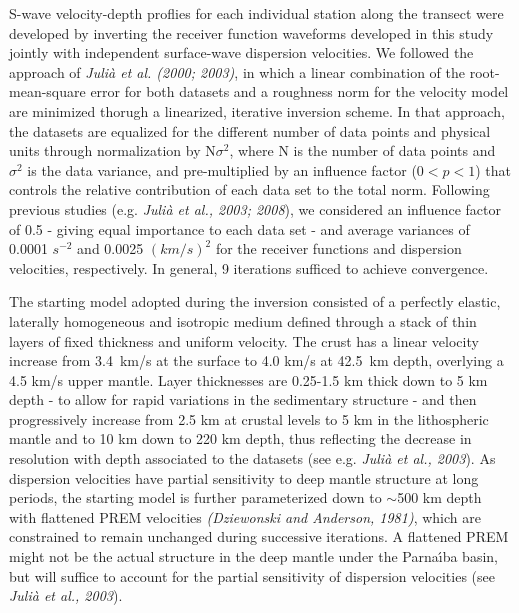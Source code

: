 \documentclass[manuscript,11pt]{geophysics}
\begin{document}
S-wave velocity-depth proflies for each individual station along the transect were developed by inverting the receiver function waveforms developed in this study jointly with independent surface-wave dispersion velocities. We followed the approach of \textit{Juli\`a et al. (2000; 2003)}, in which a linear combination of the root-mean-square error for both datasets and a roughness norm for the velocity model are minimized thorugh a linearized, iterative inversion scheme. In that approach, the datasets are equalized for the different number of data points and physical units through normalization by N$\sigma^2$, where N is the number of data points and $\sigma^2$ is the data variance, and pre-multiplied by an influence factor ($0 < p < 1$) that controls the relative contribution of each data set to the total norm. Following previous studies (e.g. \textit{Juli\`a et al., 2003; 2008}), we considered an influence factor of 0.5 - giving equal importance to each data set - and average variances of 0.0001 $s^{-2}$ and 0.0025 $(km/s)^2$ for the receiver functions and dispersion velocities, respectively. In general, 9 iterations sufficed to achieve convergence.

The starting model adopted during the inversion consisted of a perfectly elastic, laterally homogeneous and isotropic medium defined through a stack of thin layers of fixed thickness and uniform velocity. The crust has a linear velocity increase from 3.4~km/s at the surface to 4.0 km/s at 42.5~km depth, overlying a 4.5 km/s upper mantle. Layer thicknesses are 0.25-1.5 km thick down to 5 km depth - to allow for rapid variations in the sedimentary structure - and then progressively increase from 2.5 km at crustal levels to 5 km in the lithospheric mantle and to 10 km down to 220 km depth, thus reflecting the decrease in resolution with depth associated to the datasets (see e.g. \textit{Juli\`a et al., 2003}). As dispersion velocities have partial sensitivity to deep mantle structure at long periods, the starting model is further parameterized down to $\sim$500 km depth with flattened PREM velocities \textit{(Dziewonski and Anderson, 1981)}, which are constrained to remain unchanged during successive iterations. A flattened PREM might not be the actual structure in the deep mantle under the Parna\'{\i}ba basin, but will suffice to account for the partial sensitivity of dispersion velocities (see \textit{Juli\`a et al., 2003}).
\end{document}
